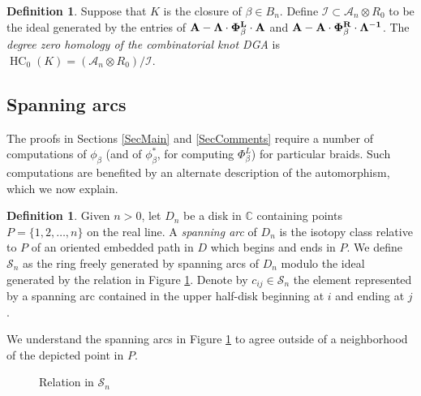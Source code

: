 \documentclass[11pt]{amsart}
\def\C{{\mathbb C}}
\def\A{{\mathcal A}}
\theoremstyle{definition}
\newtheorem{defn}[thm]{Definition}
\begin{document}
  \begin{defn}
  Suppose that $K$ is the closure of $\beta\in B_n$. Define $\mathcal{I}\subset \A_n\otimes R_0$ to be the ideal generated by the entries of $\bf{A} - \Lambda\cdot\Phi_\beta^L\cdot \bf{A}$ and $\bf{A} - \bf{A}\cdot\Phi_\beta^R\cdot\Lambda^{-1}$. The \emph{degree zero homology of the combinatorial knot DGA} is $\operatorname{HC}_0(K) = (\A_n\otimes R_0)/\mathcal{I}$.
  \label{defn:HC_0}
  \end{defn}
  
\subsection{Spanning arcs}
\label{SecSpanArcs}

  The proofs in Sections \ref{SecMain} and \ref{SecComments} require a number of computations of $\phi_\beta$ (and of $\phi_{\beta}^\ast$, for computing $\Phi_\beta^L$) for particular braids. Such computations are benefited by an alternate description of the automorphism, which we now explain.

  \begin{defn}Given $n>0$, let $D_n$ be a disk in $\C$ containing points $P=\{1,2,\ldots,n\}$ on the real line. A \emph{spanning arc} of $D_n$ is the isotopy class relative to $P$ of an oriented embedded path in $D$ which begins and ends in $P$. We define $\mathscr S_n$ as the ring freely generated by spanning arcs of $D_n$ modulo the ideal generated by the relation in Figure \ref{FigRelnPathAlg}. Denote by $c_{ij}\in\mathscr S_n$ the element represented by a spanning arc contained in the upper half-disk beginning at $i$ and ending at $j$.
  \label{DefnSpanningArcAlg}
  \end{defn}
  We understand the spanning arcs in Figure \ref{FigRelnPathAlg} to agree outside of a neighborhood of the depicted point in $P$.

  \begin{figure}[ht]
\caption{Relation in $\mathscr S_n$}
\label{FigRelnPathAlg}
  \end{figure}
\end{document}
